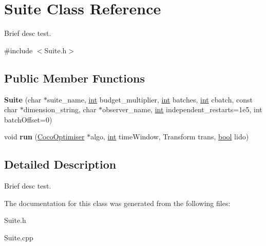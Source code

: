 \hypertarget{classSuite}{}\section{Suite Class Reference}
\label{classSuite}


Brief desc test.  




{\ttfamily \#include $<$Suite.\+h$>$}

\subsection*{Public Member Functions}
\begin{DoxyCompactItemize}
\item 
{\bfseries Suite} (char $\ast$suite\+\_\+name, \hyperlink{classint}{int} budget\+\_\+multiplier, \hyperlink{classint}{int} batches, \hyperlink{classint}{int} cbatch, const char $\ast$dimension\+\_\+string, char $\ast$observer\+\_\+name, \hyperlink{classint}{int} independent\+\_\+restarts=1e5, int batch\+Offset=0)\hypertarget{classSuite_a37ce51901fb9f68c0825c82c71e62f0a}{}\label{classSuite_a37ce51901fb9f68c0825c82c71e62f0a}

\item 
void {\bfseries run} (\hyperlink{classCocoOptimiser}{Coco\+Optimiser} $\ast$algo, \hyperlink{classint}{int} time\+Window, Transform trans, \hyperlink{classbool}{bool} lido)\hypertarget{classSuite_a5c3763da2ba087f7fa62e22e52d521be}{}\label{classSuite_a5c3763da2ba087f7fa62e22e52d521be}

\end{DoxyCompactItemize}


\subsection{Detailed Description}
Brief desc test. 

The documentation for this class was generated from the following files\+:\begin{DoxyCompactItemize}
\item 
Suite.\+h\item 
Suite.\+cpp\end{DoxyCompactItemize}
